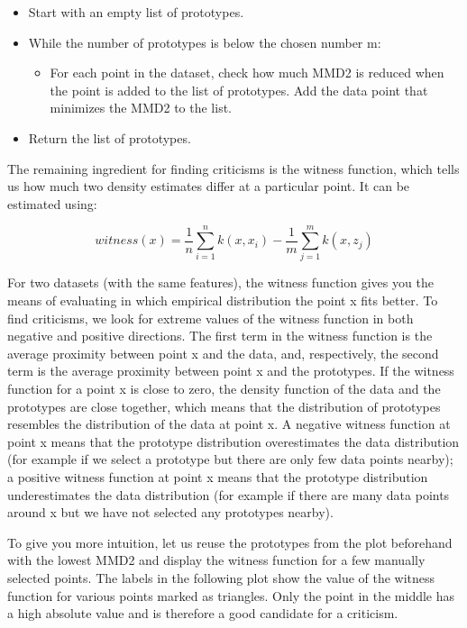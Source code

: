 \documentclass[12pt,]{krantz}
\providecommand{\tightlist}{%
  \setlength{\itemsep}{0pt}\setlength{\parskip}{0pt}}
\begin{document}
\begin{itemize}
\tightlist
\item
  Start with an empty list of prototypes.
\item
  While the number of prototypes is below the chosen number m:

  \begin{itemize}
  \tightlist
  \item
    For each point in the dataset, check how much MMD2 is reduced when
    the point is added to the list of prototypes. Add the data point
    that minimizes the MMD2 to the list.
  \end{itemize}
\item
  Return the list of prototypes.
\end{itemize}

The remaining ingredient for finding criticisms is the witness function,
which tells us how much two density estimates differ at a particular
point. It can be estimated using:

\[witness(x)=\frac{1}{n}\sum_{i=1}^nk(x,x_i)-\frac{1}{m}\sum_{j=1}^mk(x,z_j)\]

For two datasets (with the same features), the witness function gives
you the means of evaluating in which empirical distribution the point x
fits better. To find criticisms, we look for extreme values of the
witness function in both negative and positive directions. The first
term in the witness function is the average proximity between point x
and the data, and, respectively, the second term is the average
proximity between point x and the prototypes. If the witness function
for a point x is close to zero, the density function of the data and the
prototypes are close together, which means that the distribution of
prototypes resembles the distribution of the data at point x. A negative
witness function at point x means that the prototype distribution
overestimates the data distribution (for example if we select a
prototype but there are only few data points nearby); a positive witness
function at point x means that the prototype distribution underestimates
the data distribution (for example if there are many data points around
x but we have not selected any prototypes nearby).

To give you more intuition, let us reuse the prototypes from the plot
beforehand with the lowest MMD2 and display the witness function for a
few manually selected points. The labels in the following plot show the
value of the witness function for various points marked as triangles.
Only the point in the middle has a high absolute value and is therefore
a good candidate for a criticism.
\end{document}
